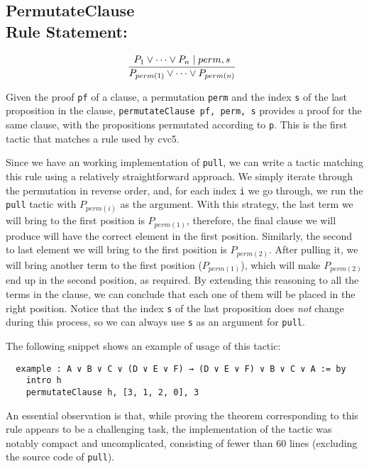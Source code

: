 \subsection*{PermutateClause\\\normalsize{Rule Statement:}}
\[
  \infer[]{P_{perm(1)} \vee \cdots \vee P_{perm(n)}}{P_{1} \vee \cdots \vee P_{n} \mid perm, s}
\]

Given the proof \texttt{pf} of a clause, a permutation \texttt{perm} and the index \texttt{s} of the last
proposition in the clause, \texttt{permutateClause pf, perm, s} provides a proof for the same clause, with
the propositions permutated according to \texttt{p}. This is the first tactic that matches a rule used by
cvc5.

Since we have an working implementation of \texttt{pull}, we can write a tactic matching
this rule using a relatively straightforward approach. We simply iterate through the permutation in
reverse order, and, for each index \texttt{i} we go through, we run the \texttt{pull} tactic
with $P_{perm(i)}$ as the argument. With this strategy, the last term we will bring to the first position is
$P_{perm(1)}$, therefore, the final clause we will produce will have the correct element in the first position.
Similarly, the second to last element we will bring to the first
position is $P_{perm(2)}$. After pulling it, we will bring another term to the first position ($P_{perm(1)}$), which will make $P_{perm(2)}$
end up in the second position, as required. By extending this reasoning to all the terms in the clause,
we can conclude that each one of them will be placed in the right position. Notice that the index \texttt{s} of
the last proposition does \textit{not} change during this process, so we can always use \texttt{s} as an argument
for \texttt{pull}.


The following snippet shows an example of usage of this tactic:

\begin{verbatim}
  example : A ∨ B ∨ C ∨ (D ∨ E ∨ F) → (D ∨ E ∨ F) ∨ B ∨ C ∨ A := by
    intro h
    permutateClause h, [3, 1, 2, 0], 3
\end{verbatim}

An essential observation is that, while proving the theorem corresponding to this rule appears to be a
challenging task, the implementation of the tactic was notably compact and uncomplicated, consisting of fewer
than 60 lines (excluding the source code of \texttt{pull}).


